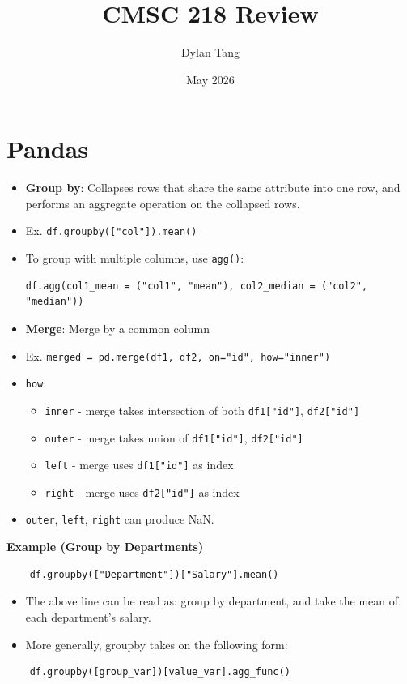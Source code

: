 \documentclass{article}
\title{CMSC 218 Review}
\author{Dylan Tang}
\date{May 2026}
\begin{document}
\maketitle

\section{Pandas}
\begin{itemize}
    \item \textbf{Group by}: Collapses rows that share the same attribute into one row, and performs an aggregate operation on the collapsed rows.
    \item Ex. \texttt{df.groupby(["col"]).mean()}
    \item To group with multiple columns, use \texttt{agg()}:
    \begin{verbatim}
df.agg(col1_mean = ("col1", "mean"), col2_median = ("col2", "median"))
    \end{verbatim}
    \item \textbf{Merge}: Merge by a common column
    \item Ex. \texttt{merged = pd.merge(df1, df2, on="id", how="inner")}
    \item \texttt{how}:
        \begin{itemize}
            \item \texttt{inner} - merge takes intersection of both \texttt{df1["id"]}, \texttt{df2["id"]}
            \item \texttt{outer} - merge takes union of \texttt{df1["id"]}, \texttt{df2["id"]}
            \item \texttt{left} - merge uses \texttt{df1["id"]} as index
            \item \texttt{right} - merge uses \texttt{df2["id"]} as index
        \end{itemize}
    \item \texttt{outer}, \texttt{left}, \texttt{right} can produce NaN.
\end{itemize}
\noindent\textbf{Example (Group by Departments)}

\begin{verbatim}
    df.groupby(["Department"])["Salary"].mean()
\end{verbatim}
\begin{itemize}
    \item The above line can be read as: group by department, and take the mean of each department's salary.
    \item More generally, groupby takes on the following form:
\end{itemize}
\begin{verbatim}
    df.groupby([group_var])[value_var].agg_func()
\end{verbatim}
\end{document}
